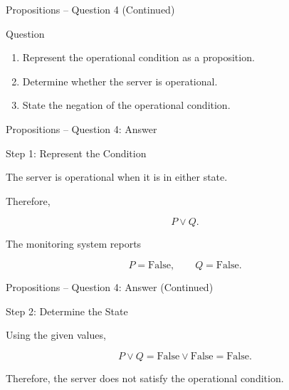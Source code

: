 \begin{frame}{Propositions -- Question 4 (Continued)}

\begin{block}{Question}

\begin{enumerate}
\item Represent the operational condition as a proposition.
\item Determine whether the server is operational.
\item State the negation of the operational condition.
\end{enumerate}

\end{block}

\end{frame}


\begin{frame}{Propositions -- Question 4: Answer}

\begin{exampleblock}{Step 1: Represent the Condition}

The server is operational when it is in either state.

Therefore,

$$
P\lor Q.
$$

The monitoring system reports

$$
P=\text{False},
\qquad
Q=\text{False}.
$$

\end{exampleblock}

\end{frame}


\begin{frame}{Propositions -- Question 4: Answer (Continued)}

\begin{exampleblock}{Step 2: Determine the State}

Using the given values,

$$
P\lor Q
=
\text{False}\lor\text{False}
=
\text{False}.
$$

Therefore, the server does not satisfy the operational condition.

\end{exampleblock}

\end{frame}

